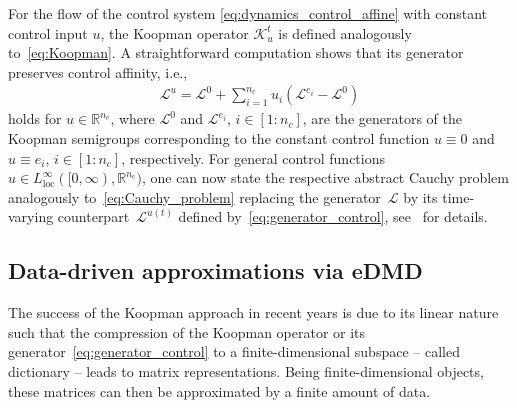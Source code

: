 \documentclass{article}
\numberwithin{equation}{section}
\newcommand{\R}{\mathbb{R}}
\newcommand{\nc}{n_c}
\newcommand{\calK}{\mathcal K}
\newcommand{\calL}{\mathcal L}
\begin{document}
	For the flow of the control system \eqref{eq:dynamics_control_affine} with constant control input $u$, the Koopman operator $\calK^t_u$ is defined analogously to~\eqref{eq:Koopman}.
	A straightforward computation shows that its generator preserves control affinity, i.e.,
	\begin{align}\label{eq:generator_control}
	\calL^{u} = \calL^0 + \sum_{i=1}^{\nc} u_i(\calL^{e_i}-\calL^0)
	\end{align}
	holds for $u \in \mathbb{R}^{\nc}$,
	where $\calL^0$ and $\calL^{e_i}$, $i\in [1:\nc]$, are the generators of the Koopman semigroups corresponding to the constant control function $u \equiv 0$ and $u \equiv e_i$, $i \in [1:\nc]$, respectively.
	For general control functions~$u \in L^\infty_{\operatorname{loc}}([0,\infty),\R^{\nc})$, one can now state the respective abstract Cauchy problem analogously to~\eqref{eq:Cauchy_problem} replacing the generator~$\mathcal{L}$ by its time-varying counterpart~$\mathcal{L}^{u(t)}$ defined by~\eqref{eq:generator_control}, see~\cite{NuskPeit23} for details.
	
	
	
	\subsection{Data-driven approximations via eDMD}
	\label{subsec:eDMD}
	
	The success of the Koopman approach in recent years is due to its linear nature such that the compression of the Koopman operator or its generator~\eqref{eq:generator_control} to a finite-dimensional subspace -- called dictionary -- leads to matrix representations. 
	Being finite-dimensional objects, these matrices can then be approximated by a finite amount of data.
	
\end{document}
